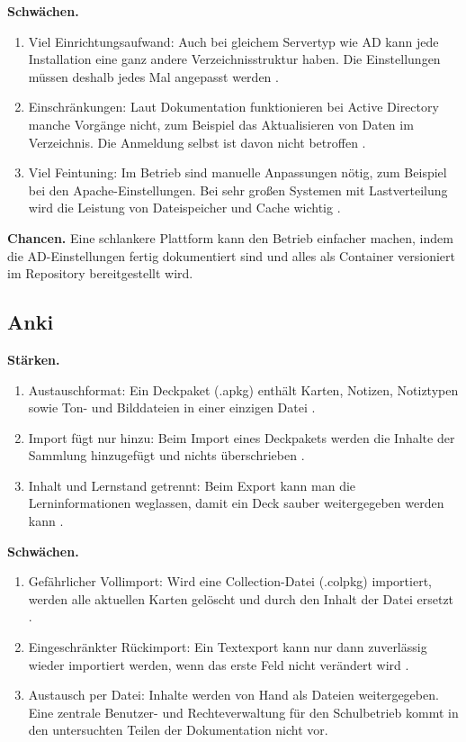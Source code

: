 \textbf{Schwächen.}
\begin{enumerate}
  \item Viel Einrichtungsaufwand: Auch bei gleichem Servertyp wie AD kann jede Installation eine ganz andere Verzeichnisstruktur haben. Die Einstellungen müssen deshalb jedes Mal angepasst werden \parencite{moodle-ldap}.
  \item Einschränkungen: Laut Dokumentation funktionieren bei Active Directory manche Vorgänge nicht, zum Beispiel das Aktualisieren von Daten im Verzeichnis. Die Anmeldung selbst ist davon nicht betroffen \parencite{moodle-ldap}.
  \item Viel Feintuning: Im Betrieb sind manuelle Anpassungen nötig, zum Beispiel bei den Apache-Einstellungen. Bei sehr großen Systemen mit Lastverteilung wird die Leistung von Dateispeicher und Cache wichtig \parencite{moodle-performance}.
\end{enumerate}
 
\textbf{Chancen.} Eine schlankere Plattform kann den Betrieb einfacher machen, indem die AD-Einstellungen fertig dokumentiert sind und alles als Container versioniert im Repository bereitgestellt wird.
 
\subsection{Anki}
 
\textbf{Stärken.}
\begin{enumerate}
  \item Austauschformat: Ein Deckpaket (.apkg) enthält Karten, Notizen, Notiztypen sowie Ton- und Bilddateien in einer einzigen Datei \parencite{anki-exporting}.
  \item Import fügt nur hinzu: Beim Import eines Deckpakets werden die Inhalte der Sammlung hinzugefügt und nichts überschrieben \parencite{anki-exporting}.
  \item Inhalt und Lernstand getrennt: Beim Export kann man die Lerninformationen weglassen, damit ein Deck sauber weitergegeben werden kann \parencite{anki-exporting}.
\end{enumerate}
 
\textbf{Schwächen.}
\begin{enumerate}
  \item Gefährlicher Vollimport: Wird eine Collection-Datei (.colpkg) importiert, werden alle aktuellen Karten gelöscht und durch den Inhalt der Datei ersetzt \parencite{anki-exporting}.
  \item Eingeschränkter Rückimport: Ein Textexport kann nur dann zuverlässig wieder importiert werden, wenn das erste Feld nicht verändert wird \parencite{anki-exporting}.
  \item Austausch per Datei: Inhalte werden von Hand als Dateien weitergegeben. Eine zentrale Benutzer- und Rechteverwaltung für den Schulbetrieb kommt in den untersuchten Teilen der Dokumentation nicht vor.
\end{enumerate}
 
